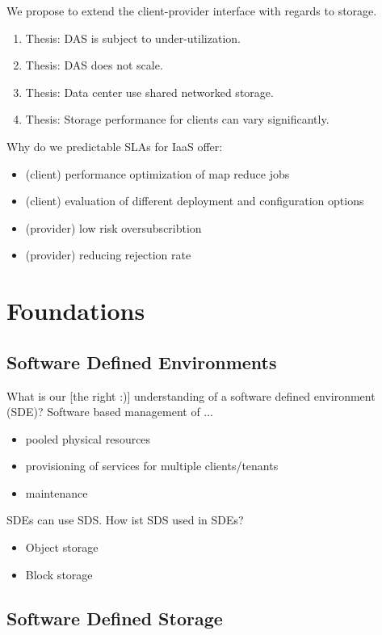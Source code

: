 We propose to extend the client-provider interface with regards to storage.
\begin{enumerate}
	\item Thesis: DAS is subject to under-utilization.
	\item Thesis: DAS does not scale.
	\item Thesis: Data center use shared networked storage.
	\item Thesis: Storage performance for clients can vary significantly.
\end{enumerate}

Why do we predictable SLAs for IaaS offer:
\begin{itemize}
	\item (client) performance optimization of map reduce jobs
	\item (client) evaluation of different deployment and configuration options
	\item (provider) low risk oversubscribtion
	\item (provider) reducing rejection rate 
\end{itemize}

\section{Foundations}

\subsection{Software Defined Environments}

What is our [the right :)] understanding of a software defined environment (SDE)?
Software based management of ...
\begin{itemize}
\item pooled physical resources
\item provisioning of services for multiple clients/tenants
\item maintenance
\end{itemize}

SDEs can use SDS. How ist SDS used in SDEs?
\begin{itemize}
\item Object storage
\item Block storage
\end{itemize}

\subsection{Software Defined Storage}

